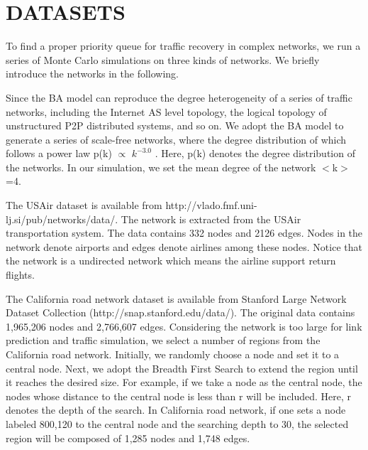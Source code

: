 \documentclass[onecolumn,preprintnumbers,amsmath,amssymb]{revtex4}
\begin{document}




\section*{DATASETS\protect}
To find a proper priority queue for traffic recovery in complex networks, we run a series of Monte Carlo simulations on three kinds of networks. We briefly introduce the networks in the following.


Since the BA\cite{BA} model can reproduce the degree heterogeneity of a series of traffic networks, including the Internet AS level topology, the logical topology of unstructured P2P distributed systems, and so on. 
We adopt the BA model to generate a series of scale-free networks, where the degree distribution of which follows a power law p(k) $\propto$ $k^{-3.0}$ . 
Here, p(k) denotes the degree distribution of the networks. 
In our simulation, we set the mean degree of the network $<$k$>$=4.


The USAir dataset is available from http://vlado.fmf.uni-lj.si/pub/networks/data/.
The network is extracted from the USAir transportation system. The data contains 332 nodes and 2126 edges.
Nodes in the network denote airports and edges denote airlines among these nodes. 
Notice that the network is a undirected network which means the airline support return flights.


The California road network dataset is available from Stanford Large Network Dataset Collection (http://snap.stanford.edu/data/).
The original data contains 1,965,206 nodes and 2,766,607 edges. 
Considering the network is too large for link prediction and traffic simulation, we select a number of regions from the California road network. 
Initially, we randomly choose a node and set it to a central node. 
Next, we adopt the Breadth First Search to extend the region until it reaches the desired size.
For example, if we take a node as the central node, the nodes whose distance to the central node is less than r will be included. Here, r denotes the depth of the search.
In California road network, if one sets a node labeled 800,120 to the central node and the searching depth to 30, the selected region will be composed of 1,285 nodes and 1,748 edges.
\end{document}
